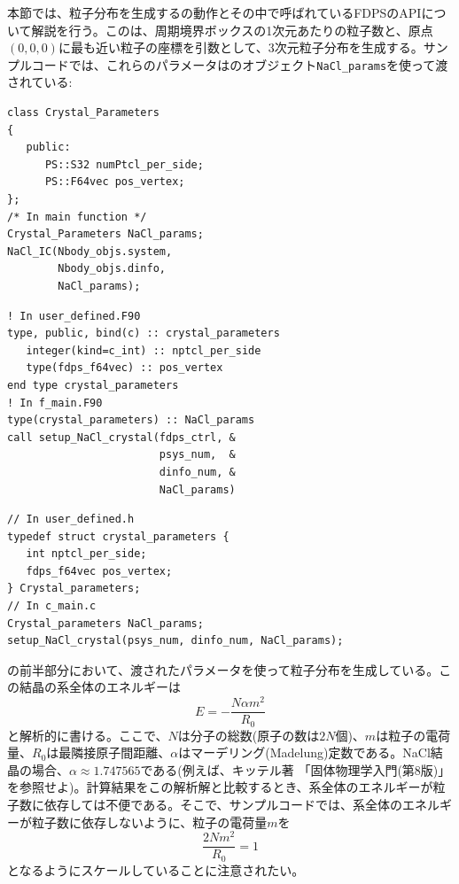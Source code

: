 本節では、粒子分布を生成する\procedure {}の動作とその中で呼ばれているFDPSのAPIについて解説を行う。この\procedure は、周期境界ボックスの1次元あたりの粒子数と、原点$(0,0,0)$に最も近い粒子の座標を引数として、3次元粒子分布を生成する。サンプルコードでは、これらのパラメータは\structure {}のオブジェクト\texttt{NaCl\_params}を使って渡されている:
\ifCpp
\begin{lstlisting}
class Crystal_Parameters
{
   public:
      PS::S32 numPtcl_per_side;
      PS::F64vec pos_vertex;
};
/* In main function */
Crystal_Parameters NaCl_params;
NaCl_IC(Nbody_objs.system,
        Nbody_objs.dinfo,
        NaCl_params);
\end{lstlisting}
\endifCpp
\ifFtn
\begin{lstlisting}
! In user_defined.F90
type, public, bind(c) :: crystal_parameters
   integer(kind=c_int) :: nptcl_per_side
   type(fdps_f64vec) :: pos_vertex
end type crystal_parameters
! In f_main.F90
type(crystal_parameters) :: NaCl_params
call setup_NaCl_crystal(fdps_ctrl, &
                        psys_num,  &
                        dinfo_num, &
                        NaCl_params)
\end{lstlisting}
\endifFtn
\ifC
\begin{lstlisting}
// In user_defined.h
typedef struct crystal_parameters {
   int nptcl_per_side;
   fdps_f64vec pos_vertex;
} Crystal_parameters;
// In c_main.c
Crystal_parameters NaCl_params;
setup_NaCl_crystal(psys_num, dinfo_num, NaCl_params);
\end{lstlisting}
\endifC

の前半部分において、渡されたパラメータを使って粒子分布を生成している。この結晶の系全体のエネルギーは
\begin{equation}
E = - \dfrac{N\alpha m^{2}}{R_{0}}
\end{equation}
と解析的に書ける。ここで、$N$は分子の総数(原子の数は$2N$個)、$m$は粒子の電荷量、$R_{0}$は最隣接原子間距離、$\alpha$はマーデリング(Madelung)定数である。NaCl結晶の場合、$\alpha\approx 1.747565$である(例えば、キッテル著 「固体物理学入門(第8版)」を参照せよ)。計算結果をこの解析解と比較するとき、系全体のエネルギーが粒子数に依存しては不便である。そこで、サンプルコードでは、系全体のエネルギーが粒子数に依存しないように、粒子の電荷量$m$を
\begin{equation}
\dfrac{2Nm^{2}}{R_{0}}=1
\end{equation}
となるようにスケールしていることに注意されたい。

